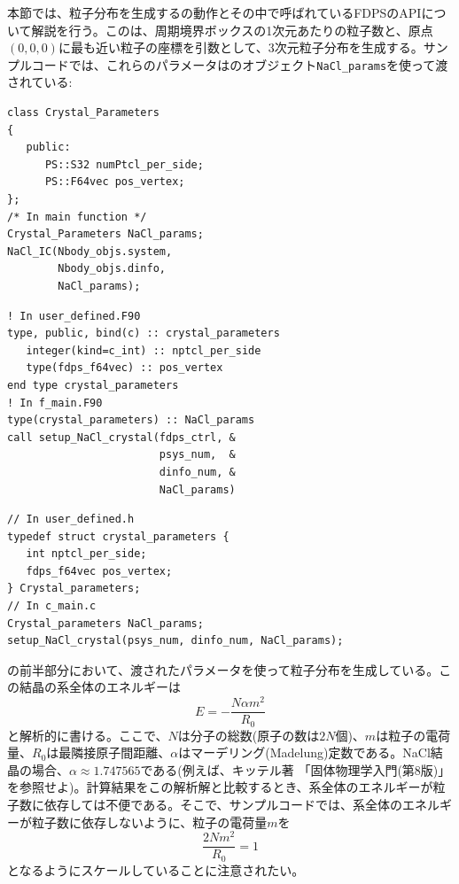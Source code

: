 本節では、粒子分布を生成する\procedure {}の動作とその中で呼ばれているFDPSのAPIについて解説を行う。この\procedure は、周期境界ボックスの1次元あたりの粒子数と、原点$(0,0,0)$に最も近い粒子の座標を引数として、3次元粒子分布を生成する。サンプルコードでは、これらのパラメータは\structure {}のオブジェクト\texttt{NaCl\_params}を使って渡されている:
\ifCpp
\begin{lstlisting}
class Crystal_Parameters
{
   public:
      PS::S32 numPtcl_per_side;
      PS::F64vec pos_vertex;
};
/* In main function */
Crystal_Parameters NaCl_params;
NaCl_IC(Nbody_objs.system,
        Nbody_objs.dinfo,
        NaCl_params);
\end{lstlisting}
\endifCpp
\ifFtn
\begin{lstlisting}
! In user_defined.F90
type, public, bind(c) :: crystal_parameters
   integer(kind=c_int) :: nptcl_per_side
   type(fdps_f64vec) :: pos_vertex
end type crystal_parameters
! In f_main.F90
type(crystal_parameters) :: NaCl_params
call setup_NaCl_crystal(fdps_ctrl, &
                        psys_num,  &
                        dinfo_num, &
                        NaCl_params)
\end{lstlisting}
\endifFtn
\ifC
\begin{lstlisting}
// In user_defined.h
typedef struct crystal_parameters {
   int nptcl_per_side;
   fdps_f64vec pos_vertex;
} Crystal_parameters;
// In c_main.c
Crystal_parameters NaCl_params;
setup_NaCl_crystal(psys_num, dinfo_num, NaCl_params);
\end{lstlisting}
\endifC

の前半部分において、渡されたパラメータを使って粒子分布を生成している。この結晶の系全体のエネルギーは
\begin{equation}
E = - \dfrac{N\alpha m^{2}}{R_{0}}
\end{equation}
と解析的に書ける。ここで、$N$は分子の総数(原子の数は$2N$個)、$m$は粒子の電荷量、$R_{0}$は最隣接原子間距離、$\alpha$はマーデリング(Madelung)定数である。NaCl結晶の場合、$\alpha\approx 1.747565$である(例えば、キッテル著 「固体物理学入門(第8版)」を参照せよ)。計算結果をこの解析解と比較するとき、系全体のエネルギーが粒子数に依存しては不便である。そこで、サンプルコードでは、系全体のエネルギーが粒子数に依存しないように、粒子の電荷量$m$を
\begin{equation}
\dfrac{2Nm^{2}}{R_{0}}=1
\end{equation}
となるようにスケールしていることに注意されたい。

